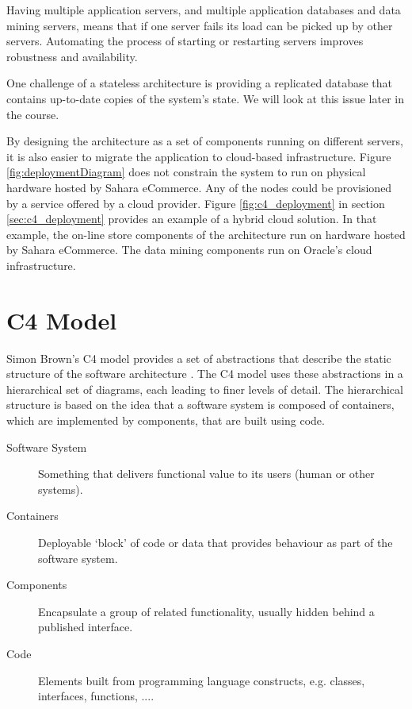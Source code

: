 Having multiple application servers, and multiple application databases and data mining servers,
means that if one server fails its load can be picked up by other servers.
Automating the process of starting or restarting servers improves robustness and availability.

One challenge of a stateless architecture is providing a replicated database that contains up-to-date copies of the system's state.
We will look at this issue later in the course.

By designing the architecture as a set of components running on different servers, it is also easier to migrate the application to cloud-based infrastructure.
Figure \ref{fig:deploymentDiagram} does not constrain the system to run on physical hardware hosted by Sahara eCommerce.
Any of the nodes could be provisioned by a service offered by a cloud provider.
Figure \ref{fig:c4_deployment} in section \ref{sec:c4_deployment} provides an example of a hybrid cloud solution.
In that example, the on-line store components of the architecture run on hardware hosted by Sahara eCommerce.
The data mining components run on Oracle's cloud infrastructure.

\section{C4 Model}
Simon Brown's C4 model provides a set of abstractions that describe the static structure of the software architecture \cite{brown2022c4}.
The C4 model uses these abstractions in a hierarchical set of diagrams, each leading to finer levels of detail.
The hierarchical structure is based on the idea that a software system is composed of containers, which are implemented by components, that are built using code.
\begin{description}
    \item[Software System] Something that delivers functional value to its users (human or other systems).
    \item[Containers] Deployable `block' of code or data that provides behaviour as part of the software system.
    \item[Components] Encapsulate a group of related functionality, usually hidden behind a published interface.
    \item[Code] Elements built from programming language constructs, e.g. classes, interfaces, functions, ....
\end{description}

